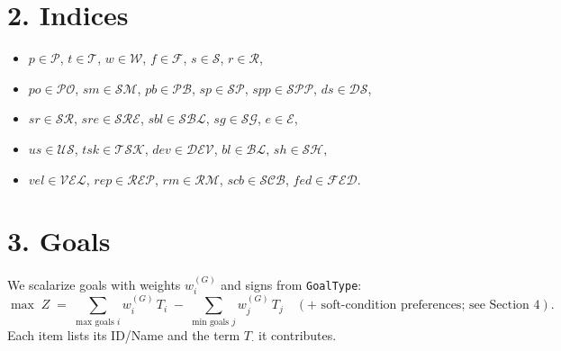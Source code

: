 \documentclass[11pt,a4paper]{article}
\begin{document}
\section{2. Indices}
\begin{itemize}[leftmargin=*]
  \item $p\in\mathcal{P}$, $t\in\mathcal{T}$, $w\in\mathcal{W}$, $f\in\mathcal{F}$, $s\in\mathcal{S}$, $r\in\mathcal{R}$,
  \item $po\in\mathcal{PO}$, $sm\in\mathcal{SM}$, $pb\in\mathcal{PB}$, $sp\in\mathcal{SP}$, $spp\in\mathcal{SPP}$, $ds\in\mathcal{DS}$,
  \item $sr\in\mathcal{SR}$, $sre\in\mathcal{SRE}$, $sbl\in\mathcal{SBL}$, $sg\in\mathcal{SG}$, $e\in\mathcal{E}$,
  \item $us\in\mathcal{US}$, $tsk\in\mathcal{TSK}$, $dev\in\mathcal{DEV}$, $bl\in\mathcal{BL}$, $sh\in\mathcal{SH}$,
  \item $vel\in\mathcal{VEL}$, $rep\in\mathcal{REP}$, $rm\in\mathcal{RM}$, $scb\in\mathcal{SCB}$, $fed\in\mathcal{FED}$.
\end{itemize}

\section{3. Goals}
We scalarize goals with weights $w^{(G)}_i$ and signs from \texttt{GoalType}:
\[
\max \; Z \;=\; \sum_{\text{max goals }i} w^{(G)}_i\, T_i \;-\; \sum_{\text{min goals }j} w^{(G)}_j\, T_j
\quad (+\text{ soft-condition preferences; see Section 4}).
\]
Each item lists its ID/Name and the term $T_{\cdot}$ it contributes.
\end{document}
